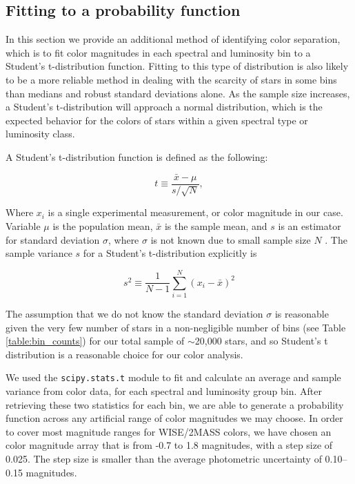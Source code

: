 \subsection{Fitting to a probability function} \label{subsec:tdist_stats}
In this section we provide an additional method of identifying color separation, which is to fit color magnitudes in each spectral and luminosity bin to a Student's t-distribution function. Fitting to this type of distribution is also likely to be a more reliable method in dealing with the scarcity of stars in some bins than medians and robust standard deviations alone. As the sample size increases, a Student's t-distribution will approach a normal distribution, which is the expected behavior for the colors of stars within a given spectral type or luminosity class.

A Student's t-distribution function is defined as the following:

\begin{equation}
    t \equiv \frac{\bar{x}-\mu}{s/\sqrt{N}} ,
\end{equation}

Where $x_{i}$ is a single experimental measurement, or color magnitude in our case. Variable $\mu$ is the population mean, $\bar{x}$ is the sample mean, and $s$ is an estimator for standard deviation $\sigma$, where $\sigma$ is not known due to small sample size $N$ \citep{student-t}. The sample variance $s$ for a Student's t-distribution explicitly is

\begin{equation}
    s^2 \equiv \frac{1}{N-1}\sum_{i=1}^{N} (x_{i}-\bar{x})^2
\end{equation}

The assumption that we do not know the standard deviation $\sigma$ is reasonable given the very few number of stars in a non-negligible number of bins (see Table \ref{table:bin_counts}) for our total sample of $\sim$20,000 stars, and so Student's t distribution is a reasonable choice for our color analysis.

We used the \texttt{scipy.stats.t} module to fit and calculate an average and sample variance from color data, for each spectral and luminosity group bin. After retrieving these two statistics for each bin, we are able to generate a probability function across any artificial range of color magnitudes we may choose. In order to cover most magnitude ranges for WISE/2MASS colors, we have chosen an color magnitude array that is from -0.7 to 1.8 magnitudes, with a step size of 0.025. The step size is smaller than the average photometric uncertainty of 0.10--0.15 magnitudes. 

